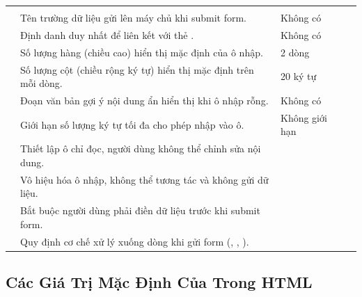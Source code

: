 \begin{prettyTableBox}
\begin{tabularx}{\linewidth}{K{2.8cm} Z K{2.2cm} Z}
 &  &  &  \\
 & Tên trường dữ liệu gửi lên máy chủ khi submit form. & Không có &  \\
 & Định danh duy nhất để liên kết với thẻ . & Không có &  \\
 & Số lượng hàng (chiều cao) hiển thị mặc định của ô nhập. & 2 dòng &  \\
 & Số lượng cột (chiều rộng ký tự) hiển thị mặc định trên mỗi dòng. & 20 ký tự &  \\
 & Đoạn văn bản gợi ý nội dung ẩn hiển thị khi ô nhập rỗng. & Không có &  \\
 & Giới hạn số lượng ký tự tối đa cho phép nhập vào ô. & Không giới hạn &  \\
 & Thiết lập ô chỉ đọc, người dùng không thể chỉnh sửa nội dung. &  &  \\
 & Vô hiệu hóa ô nhập, không thể tương tác và không gửi dữ liệu. &  &  \\
 & Bắt buộc người dùng phải điền dữ liệu trước khi submit form. &  &  \\
 & Quy định cơ chế xử lý xuống dòng khi gửi form (, , ). &  &  \\
\end{tabularx}
\end{prettyTableBox}

\subsection{Các Giá Trị Mặc Định Của  Trong HTML}

